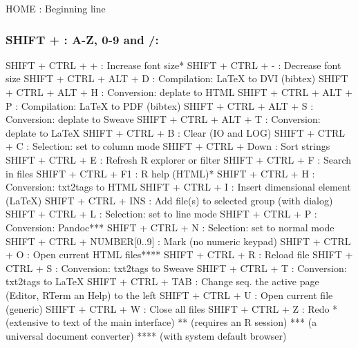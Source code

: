 \vspace{-0.5cm}
\begin{Rtables}[caption={[HOME keyboard shortcut]
    HOME keyboard shortcut},
  label=shortcut:home]
  HOME    : Beginning line
\end{Rtables}


\newpage
\subsubsection{SHIFT + : A-Z, 0-9 and /:}

\begin{Rtables}[caption={[SHIFT + keyboard shortcuts]
    SHIFT + keyboard shortcuts},
  label=shortcut:shiftplus]
  SHIFT + CTRL + +            : Increase font size*
  SHIFT + CTRL + -            : Decrease font size
  SHIFT + CTRL + ALT + D      : Compilation: LaTeX to DVI (bibtex)
  SHIFT + CTRL + ALT + H      : Conversion: deplate to HTML
  SHIFT + CTRL + ALT + P      : Compilation: LaTeX to PDF (bibtex)
  SHIFT + CTRL + ALT + S      : Conversion: deplate to Sweave
  SHIFT + CTRL + ALT + T      : Conversion: deplate to LaTeX
  SHIFT + CTRL + B            : Clear (IO and LOG)
  SHIFT + CTRL + C            : Selection: set to column mode
  SHIFT + CTRL + Down         : Sort strings
  SHIFT + CTRL + E            : Refresh R explorer or filter
  SHIFT + CTRL + F            : Search in files
  SHIFT + CTRL + F1           : R help (HTML)*
  SHIFT + CTRL + H            : Conversion: txt2tags to HTML
  SHIFT + CTRL + I            : Insert dimensional element (LaTeX)
  SHIFT + CTRL + INS          : Add file(s) to selected group (with dialog)
  SHIFT + CTRL + L            : Selection: set to line mode
  SHIFT + CTRL + P            : Conversion: Pandoc***
  SHIFT + CTRL + N            : Selection: set to normal mode
  SHIFT + CTRL + NUMBER[0..9] : Mark (no numeric keypad)
  SHIFT + CTRL + O            : Open current HTML files****
  SHIFT + CTRL + R            : Reload file
  SHIFT + CTRL + S            : Conversion: txt2tags to Sweave
  SHIFT + CTRL + T            : Conversion: txt2tags to LaTeX
  SHIFT + CTRL + TAB          : Change seq. the active page
                                (Editor, RTerm an Help) to the left
  SHIFT + CTRL + U            : Open current file (generic)
  SHIFT + CTRL + W            : Close all files
  SHIFT + CTRL + Z            : Redo
  *    (extensive to text of the main interface)
  **   (requires an R session)
  ***  (a universal document converter)
  **** (with system default browser)
\end{Rtables}
